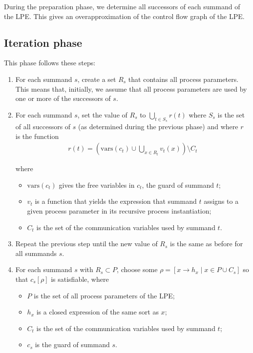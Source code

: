 During the preparation phase, we determine all successors of each summand of the LPE.
This gives an overapproximation of the control flow graph of the LPE.

\subsection{Iteration phase}

This phase follows these steps:

\begin{enumerate}

\item For each summand $s$, create a set $R_s$ that contains all process parameters.
This means that, initially, we assume that all process parameters are used by one or more of the successors of $s$.

\item For each summand $s$, set the value of $R_s$ to $\bigcup\limits_{t \in S_s}^{} r(t)$ where $S_s$ is the set of all successors of $s$ (as determined during the previous phase) and where $r$ is the function
\begin{align*}
r(t) = \left( \text{vars}(c_t) \cup \bigcup\limits_{x \in R_t}^{} v_t(x) \right) \setminus C_t
\end{align*}

where

\begin{itemize}
\item $\text{vars}(c_t)$ gives the free variables in $c_t$, the guard of summand $t$;
\item $v_t$ is a function that yields the expression that summand $t$ assigns to a given process parameter in its recursive process instantiation;
\item $C_t$ is the set of the communication variables used by summand $t$.
\end{itemize}

\item Repeat the previous step until the new value of $R_s$ is the same as before for all summands $s$.

\item For each summand $s$ with $R_s \subset P$, choose some $\rho = [x \rightarrow h_x \;|\; x \in P \cup C_s]$ so that ${c_s}[\rho]$ is satisfiable, where

\begin{itemize}
\item $P$ is the set of all process parameters of the LPE;
\item $h_x$ is a closed expression of the same sort as $x$;
\item $C_t$ is the set of the communication variables used by summand $t$;
\item $c_s$ is the guard of summand $s$.
\end{itemize}


\end{enumerate}

